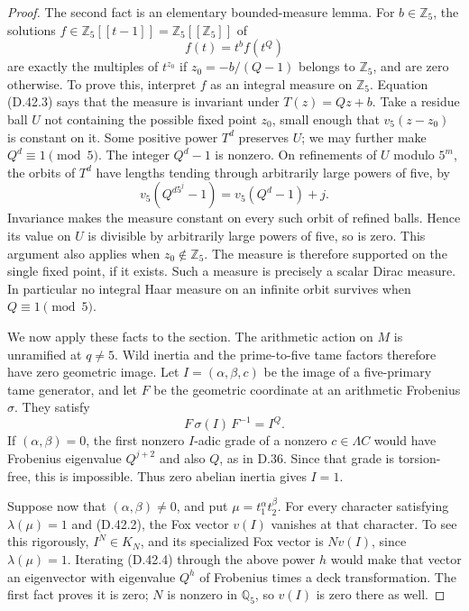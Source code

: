\begin{proof}
The second fact is an elementary bounded-measure
lemma. For \(b\in\mathbb Z_5\), the solutions
\(f\in\mathbb Z_5[[t-1]]=\mathbb Z_5[[\mathbb Z_5]]\)
of
\[
                       f(t)=t^b f(t^Q)                  \tag{D.42.3}
\]
are exactly the multiples of \(t^{z_0}\) if
\(z_0=-b/(Q-1)\) belongs to \(\mathbb Z_5\), and
are zero otherwise. To prove this, interpret \(f\)
as an integral measure on \(\mathbb Z_5\).
Equation (D.42.3) says that the measure is invariant
under \(T(z)=Qz+b\). Take a residue ball \(U\)
not containing the possible fixed point \(z_0\),
small enough that \(v_5(z-z_0)\) is constant on it.
Some positive power \(T^d\) preserves \(U\);
we may further make \(Q^d\equiv1\pmod5\).
The integer \(Q^d-1\) is nonzero.
On refinements of \(U\) modulo \(5^m\), the
orbits of \(T^d\) have lengths tending through
arbitrarily large powers of five, by
\[
 v_5(Q^{d5^j}-1)=v_5(Q^d-1)+j.
\]
Invariance makes the measure constant on every
such orbit of refined balls. Hence its value
on \(U\) is divisible by arbitrarily large
powers of five, so is zero. This argument
also applies when \(z_0\notin\mathbb Z_5\).
The measure is therefore supported on the
single fixed point, if it exists. Such a
measure is precisely a scalar Dirac measure.
In particular no integral Haar measure on
an infinite orbit survives when \(Q\equiv1\pmod5\).

We now apply these facts to the section. The
arithmetic action on \(M\) is unramified at
\(q\ne5\). Wild inertia and the prime-to-five
tame factors therefore have zero geometric
image. Let \(I=(\alpha,\beta,c)\) be the image
of a five-primary tame generator, and let
\(F\) be the geometric coordinate at an
arithmetic Frobenius \(\sigma\). They satisfy
\[
                      F\,\sigma(I)\,F^{-1}=I^Q.          \tag{D.42.4}
\]
If \((\alpha,\beta)=0\), the first nonzero
\(I\)-adic grade of a nonzero \(c\in\Lambda C\)
would have Frobenius eigenvalue \(Q^{j+2}\)
and also \(Q\), as in D.36. Since that grade
is torsion-free, this is impossible. Thus
zero abelian inertia gives \(I=1\).

Suppose now that \((\alpha,\beta)\ne0\), and put
\(\mu=t_1^\alpha t_2^\beta\).
For every character satisfying \(\lambda(\mu)=1\)
and (D.42.2), the Fox vector \(v(I)\) vanishes
at that character. To see this rigorously,
\(I^N\in K_N\), and its specialized Fox vector
is \(N v(I)\), since \(\lambda(\mu)=1\).
Iterating (D.42.4) through the above power \(h\)
would make that vector an eigenvector with
eigenvalue \(Q^h\) of Frobenius times a deck
transformation. The first fact proves it is
zero; \(N\) is nonzero in \(\mathbb Q_5\), so
\(v(I)\) is zero there as well.


\end{proof}
